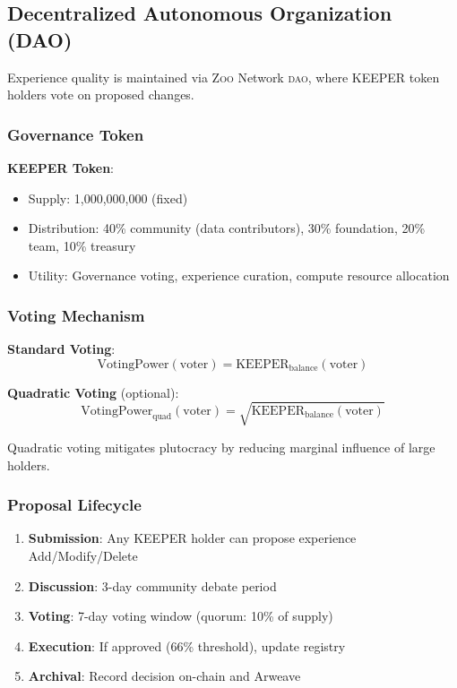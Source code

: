 \documentclass[11pt,letterpaper]{article}
\newcommand{\Zoo}{\textsc{Zoo}}
\newcommand{\DAO}{\textsc{dao}}
\begin{document}
\subsection{Decentralized Autonomous Organization (DAO)}

Experience quality is maintained via \Zoo{} Network \DAO{}, where KEEPER token holders vote on proposed changes.

\subsubsection{Governance Token}

\textbf{KEEPER Token}:
\begin{itemize}
    \item Supply: 1,000,000,000 (fixed)
    \item Distribution: 40\% community (data contributors), 30\% foundation, 20\% team, 10\% treasury
    \item Utility: Governance voting, experience curation, compute resource allocation
\end{itemize}

\subsubsection{Voting Mechanism}

\textbf{Standard Voting}:
\begin{equation}
\text{VotingPower}(\text{voter}) = \text{KEEPER}_{\text{balance}}(\text{voter})
\end{equation}

\textbf{Quadratic Voting} (optional):
\begin{equation}
\text{VotingPower}_{\text{quad}}(\text{voter}) = \sqrt{\text{KEEPER}_{\text{balance}}(\text{voter})}
\end{equation}

Quadratic voting mitigates plutocracy by reducing marginal influence of large holders.

\subsubsection{Proposal Lifecycle}

\begin{enumerate}
    \item \textbf{Submission}: Any KEEPER holder can propose experience Add/Modify/Delete
    \item \textbf{Discussion}: 3-day community debate period
    \item \textbf{Voting}: 7-day voting window (quorum: 10\% of supply)
    \item \textbf{Execution}: If approved (66\% threshold), update registry
    \item \textbf{Archival}: Record decision on-chain and Arweave
\end{enumerate}
\end{document}
